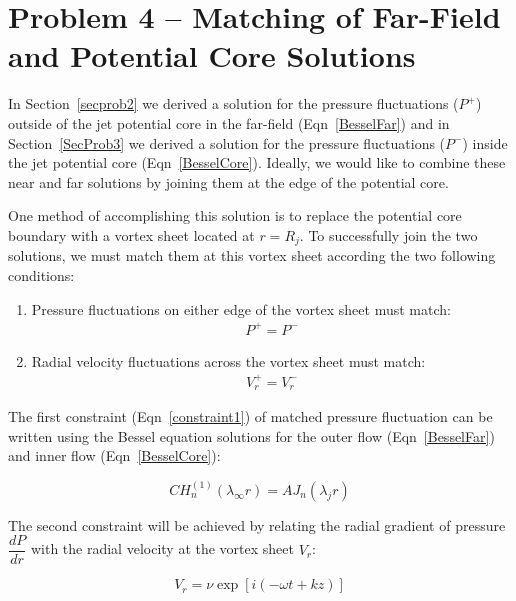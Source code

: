 \documentclass[]{aiaa-tc}%
\begin{document}
\section{Problem 4 -- Matching of Far-Field and Potential Core Solutions}

In Section~\ref{secprob2} we derived a solution for the pressure fluctuations ($P^+$) outside of the jet potential core in the far-field (Eqn~\ref{BesselFar}) and in Section~\ref{SecProb3} we derived a solution for the pressure fluctuations ($P^-$) inside the jet potential core (Eqn~\ref{BesselCore}).  Ideally, we would like to combine these near and far solutions by joining them at the edge of the potential core.

One method of accomplishing this solution is to replace the potential core boundary with a vortex sheet located at $r = R_j$.  To successfully join the two solutions, we must match them at this vortex sheet according the two following conditions:

\begin{enumerate}
  \item Pressure fluctuations on either edge of the vortex sheet must match:
        \begin{align} \label{constraint1}
          P^+ = P^-
        \end{align}
  \item Radial velocity fluctuations across the vortex sheet must match:
        \begin{align} \label{constraint2}
          V_r^+ = V_r^-
        \end{align}
\end{enumerate}

The first constraint (Eqn~\ref{constraint1}) of matched pressure fluctuation can be written using the Bessel equation solutions for the outer flow (Eqn~\ref{BesselFar}) and inner flow (Eqn~\ref{BesselCore}):

\begin{equation} \label{constantsEqn1}
\boxed{C H_n^{(1)}(\lambda_{\infty} r) = A J_n(\lambda_j r)}
\end{equation}

The second constraint will be achieved by relating the radial gradient of pressure $\dfrac{dP}{dr}$ with the radial velocity at the vortex sheet $V_r$:

\begin{equation}
V_r = \nu \exp[i(-\omega t + kz)]
\end{equation}
\end{document}

